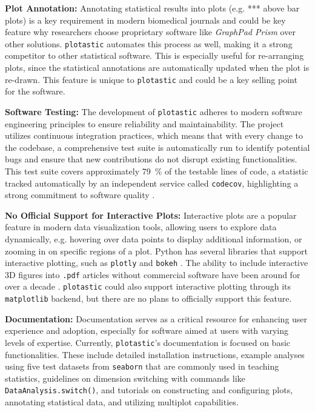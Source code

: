 \textbf{Plot Annotation:} Annotating statistical results into plots (e.g. ***
above bar plots) is a key requirement in modern biomedical journals and could be
key feature why researchers choose proprietary software like \textit{GraphPad
    Prism} over other solutions. \texttt{plotastic} automates this process as well,
making it a strong competitor to other statistical software. This is especially
useful for re-arranging plots, since the statistical annotations are
automatically updated when the plot is re-drawn. This feature is unique to
\texttt{plotastic} and could be a key selling point for the software.


\textbf{Software Testing:} The development of \texttt{plotastic} adheres to
modern software engineering principles to ensure reliability and
maintainability. The project utilizes continuous integration practices, which
means that with every change to the codebase, a comprehensive test suite is
automatically run to identify potential bugs and ensure that new contributions
do not disrupt existing functionalities. This test suite covers approximately
\SI{79}{\percent} of the testable lines of code, a statistic tracked
automatically by an independent service called \texttt{codecov}, highlighting a
strong commitment to software quality \cite{Codecov}.

\textbf{No Official Support for Interactive Plots:} Interactive plots are a popular feature
in modern data visualization tools, allowing users to explore data dynamically,
e.g. hovering over data points to display additional information, or zooming in
on specific regions of a plot. Python has several libraries that support
interactive plotting, such as \texttt{plotly} and \texttt{bokeh}
\cite{plotly,bokehdevelopmentteamBokehPythonLibrary2018}. The ability to include
interactive 3D figures into \texttt{.pdf} articles without commercial software
have been around for over a decade
\cite{barnesEmbeddingPublishingInteractive2013}. \texttt{plotastic} could
also support interactive plotting through its \texttt{matplotlib} backend,
but there are no plans to officially support this feature.

\textbf{Documentation:}
Documentation serves as a critical resource for enhancing user experience and
adoption, especially for software aimed at users with varying levels of
expertise. Currently, \texttt{plotastic}'s documentation is focused on basic
functionalities. These include detailed installation instructions, example
analyses using five test datasets from \texttt{seaborn} that are commonly used
in teaching statistics, guidelines on dimension switching with commands like
\texttt{DataAnalysis.switch()}, and tutorials on constructing and configuring
plots, annotating statistical data, and utilizing multiplot capabilities.

